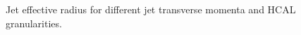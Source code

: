 \begin{figure}
\begin{center}
{   }
\end{center}
\caption{Jet effective radius for different jet transverse momenta and HCAL granularities.}
\label{fig:eff_rad}
\end{figure}


